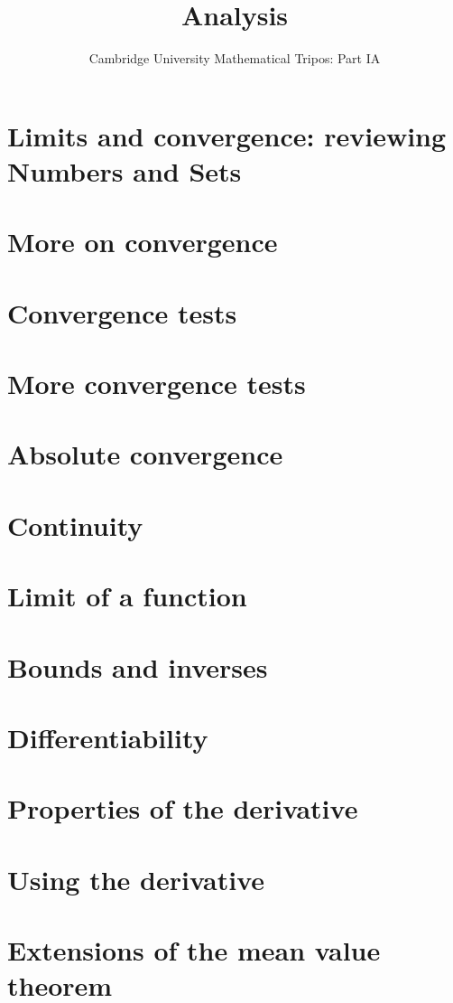 \documentclass{article}
\title{Analysis}
\author{Cambridge University Mathematical Tripos: Part IA}
\begin{document}
\maketitle

\tableofcontentsnewpage{}

\section{Limits and convergence: reviewing Numbers and Sets}

\section{More on convergence}

\section{Convergence tests}

\section{More convergence tests}

\section{Absolute convergence}

\section{Continuity}

\section{Limit of a function}

\section{Bounds and inverses}

\section{Differentiability}

\section{Properties of the derivative}

\section{Using the derivative}

\section{Extensions of the mean value theorem}

\end{document}
